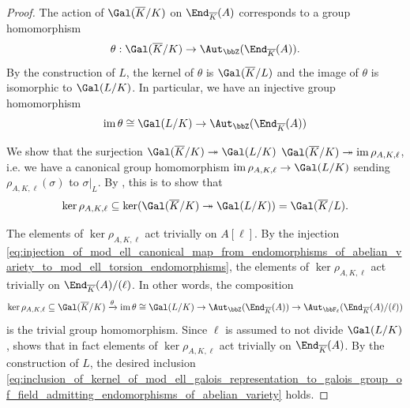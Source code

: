 \begin{proof}
    The action of $\Gal(\overline{K}/K)$ on $\End_{\overline{K}}(A)$ corresponds to a group homomorphism 
    $$\theta: \Gal(\overline{K}/K) \to \Aut_\bbZ(\End_{\overline{K}}(A)).$$
    By the construction of $L$, the kernel of $\theta$ is $\Gal(\overline{K}/L)$ and the image of $\theta$ is isomorphic to $\Gal(L/K)$. In particular, we have an injective group homomorphism 
    $$\operatorname{im} \theta \cong \Gal(L/K) \to \Aut_\bbZ(\End_{\overline{K}}(A))$$ 

    We show that the surjection $\Gal(\overline{K}/K) \twoheadrightarrow \Gal(L/K)$  $\Gal(\overline{K}/K) \twoheadrightarrow \operatorname{im} \rho_{A,K,\ell}$, i.e. we have a canonical group homomorphism $\operatorname{im} \rho_{A,K,\ell} \to \Gal(L/K)$ sending $\rho_{A,K,\ell}(\sigma)$ to $\sigma|_L$. By , this is to show that 
    \begin{equation} \label{eq:inclusion_of_kernel_of_mod_ell_galois_representation_to_galois_group_of_field_admitting_endomorphisms_of_abelian_variety}
    \ker \rho_{A,K,\ell} \subseteq \ker(\Gal(\overline{K}/K) \twoheadrightarrow \Gal(L/K)) = \Gal(\overline{K}/L).
    \end{equation}

    The elements of $\ker \rho_{A,K,\ell}$ act trivially on $A[\ell]$. By the injection \eqref{eq:injection_of_mod_ell_canonical_map_from_endomorphisms_of_abelian_variety_to_mod_ell_torsion_endomorphisms}, the elements of $\ker \rho_{A,K,\ell}$ act trivially on $\End_{\overline{K}}(A)/(\ell)$. In other words, the composition 
    $$\ker \rho_{A,K,\ell} \subseteq \Gal(\overline{K}/K) \xrightarrow{\theta} \operatorname{im} \theta \cong \Gal(L/K) \to \Aut_{\bbZ}(\End_{\overline{K}}(A)) \to \Aut_{\bbF_\ell}(\End_{\overline{K}}(A)/(\ell))$$
    is the trivial group homomorphism. Since $\ell$ is assumed to not divide $\Gal(L/K)$,  shows that in fact elements of $\ker \rho_{A,K,\ell}$ act trivially on $\End_{\overline{K}}(A)$. By the construction of $L$, the desired inclusion \eqref{eq:inclusion_of_kernel_of_mod_ell_galois_representation_to_galois_group_of_field_admitting_endomorphisms_of_abelian_variety} holds. 
\end{proof}